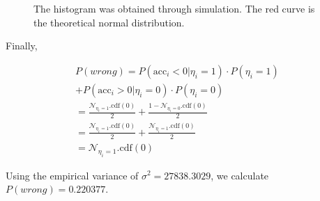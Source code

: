 \begin{figure}[h!]
  \centering


  \caption{The histogram was obtained through simulation. The red curve is the theoretical normal distribution.}
  \label{fig:sdm-read}
\end{figure}


Finally,

\begin{align*}
P(wrong) = P(\text{acc}_i < 0 | \eta_i = 1) \cdot P(\eta_i = 1) {}& \\
+P(\text{acc}_i > 0 | \eta_i = 0) \cdot P(\eta_i = 0) \\
= \frac{\mathcal{N}_{\eta_i=1}.\text{cdf}(0)}{2} + \frac{1-\mathcal{N}_{\eta_i=0}.\text{cdf}(0)}{2} \\
= \frac{\mathcal{N}_{\eta_i=1}.\text{cdf}(0)}{2} + \frac{\mathcal{N}_{\eta_i=1}.\text{cdf}(0)}{2} \\
= \mathcal{N}_{\eta_i=1}.\text{cdf}(0)
\end{align*}





Using the empirical variance of $\sigma^2 = 27838.3029$, we calculate $P(wrong) = 0.220377$.

